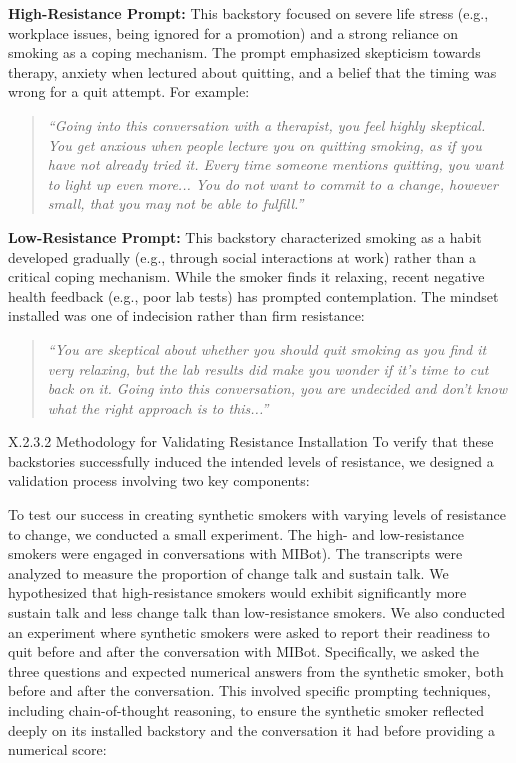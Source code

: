 \textbf{High-Resistance Prompt:} This backstory focused on severe life stress (e.g., workplace issues, being ignored for a promotion) and a strong reliance on smoking as a coping mechanism. The prompt emphasized skepticism towards therapy, anxiety when lectured about quitting, and a belief that the timing was wrong for a quit attempt. For example:

\begin{quote}
\textit{``Going into this conversation with a therapist, you feel highly skeptical. You get anxious when people lecture you on quitting smoking, as if you have not already tried it. Every time someone mentions quitting, you want to light up even more... You do not want to commit to a change, however small, that you may not be able to fulfill.''}  
\end{quote}

\textbf{Low-Resistance Prompt:} This backstory characterized smoking as a habit developed gradually (e.g., through social interactions at work) rather than a critical coping mechanism. While the smoker finds it relaxing, recent negative health feedback (e.g., poor lab tests) has prompted contemplation. The mindset installed was one of indecision rather than firm resistance:

\begin{quote}
\textit{``You are skeptical about whether you should quit smoking as you find it very relaxing, but the lab results did make you wonder if it's time to cut back on it. Going into this conversation, you are undecided and don't know what the right approach is to this...''}  
\end{quote}


X.2.3.2 Methodology for Validating Resistance Installation
To verify that these backstories successfully induced the intended levels of resistance, we designed a validation process involving two key components:

To test our success in creating synthetic smokers with varying levels of resistance to change, we conducted a small experiment. The high- and low-resistance smokers were engaged in conversations with MIBot). The transcripts were analyzed to measure the proportion of change talk and sustain talk. We hypothesized that high-resistance smokers would exhibit significantly more sustain talk and less change talk than low-resistance smokers. We also conducted an experiment where synthetic smokers were asked to report their readiness to quit before and after the conversation with MIBot. Specifically, we asked the three questions and expected numerical answers from the synthetic smoker, both before and after the conversation.  This involved specific prompting techniques, including chain-of-thought reasoning, to ensure the synthetic smoker reflected deeply on its installed backstory and the conversation it had before providing a numerical score:

